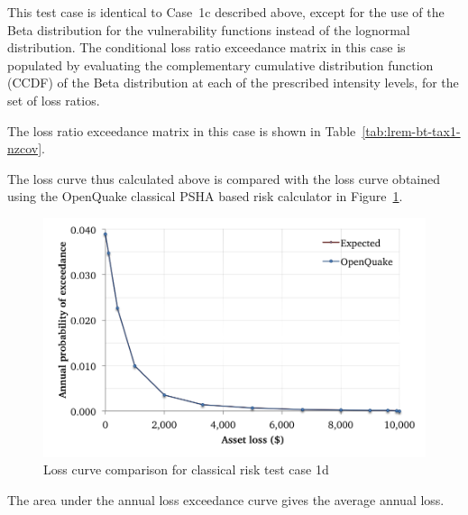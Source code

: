 This test case is identical to Case~1c described above, except for the use of the Beta distribution for the vulnerability functions instead of the lognormal distribution. The conditional loss ratio exceedance matrix in this case is populated by evaluating the complementary cumulative distribution function (CCDF) of the Beta distribution at each of the prescribed intensity levels, for the set of loss ratios.



The loss ratio exceedance matrix in this case is shown in Table~\ref{tab:lrem-bt-tax1-nzcov}.

The loss curve thus calculated above is compared with the loss curve obtained using the OpenQuake classical PSHA based risk calculator in Figure~\ref{fig:lc-cr-1d}.

\begin{figure}[htbp]
\centering
\includegraphics[width=12cm]{qareport/figures/fig-lc-cr-1d}
\caption{Loss curve comparison for classical risk test case 1d}
\label{fig:lc-cr-1d}
\end{figure}

The area under the annual loss exceedance curve gives the average annual loss.